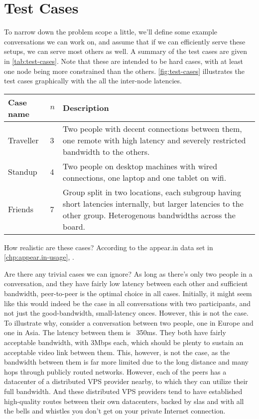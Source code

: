 \chapter{Test Cases}

To narrow down the problem scope a little, we'll define some example conversations we can work on, and assume that if we can efficiently serve these setups, we can serve most others as well. A summary of the test cases are given in \autoref{tab:test-cases}. Note that these are intended to be hard cases, with at least one node being more constrained than the others. \autoref{fig:test-cases} illustrates the test cases graphically with the all the inter-node latencies.

\begin{center}
    \label{tab:test-cases}
    \begin{tabular}{| l | l | p{7cm} |}
    \hline
    \textbf{Case name} & \textbf{$n$} & \textbf{Description} \\ \hline
    Traveller & 3 & Two people with decent connections between them, one remote with high latency and severely restricted bandwidth to the others. \\ \hline
    Standup & 4 & Two people on desktop machines with wired connections, one laptop and one tablet on wifi. \\ \hline
    Friends & 7 & Group split in two locations, each subgroup having short latencies internally, but larger latencies to the other group. Heterogenous bandwidths across the board. \\ \hline
    \end{tabular}
\end{center}

How realistic are these cases? According to the appear.in data set in \autoref{chp:appear.in-usage}, .

Are there any trivial cases we can ignore? As long as there's only two people in a conversation, and they have fairly low latency between each other and sufficient bandwidth, peer-to-peer is the optimal choice in all cases. Initially, it might seem like this would indeed be the case in all conversations with two participants, and not just the good-bandwidth, small-latency onces. However, this is not the case. To illustrate why, consider a conversation between two people, one in Europe and one in Asia. The latency between them is ~350ms. They both have fairly acceptable bandwidth, with 3Mbps each, which should be plenty to sustain an acceptable video link between them. This, however, is not the case, as the bandwidth between them is far more limited due to the long distance and many hops through publicly routed networks. However, each of the peers has a datacenter of a distributed VPS provider nearby, to which they can utilize their full bandwidth. And these distributed VPS providers tend to have established high-quality routes between their own datacenters, backed by \glspl{sla} and with all the bells and whistles you don't get on your private Internet connection.

